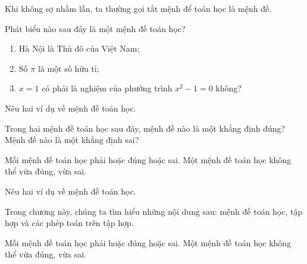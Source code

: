 \documentclass[Main.tex]{subfiles}
\begin{document}
	\begin{note}
		Khi không sợ nhầm lẫn, ta thường gọi tắt mệnh để toán học là mệnh đề.
	\end{note}
	
	\begin{vd}
		Phát biểu nào sau đây là một mệnh đề toán học?
		\begin{enumerate}
			\item Hà Nội là Thủ đô của Việt Nam;
			\item Số $\pi$ là một số hữu tỉ;
			\item $x=1$ có phải là nghiệm của phưởng trình $x^2-1=0$
			không?
		\end{enumerate}
	\end{vd}
	
	\begin{luyentap}
		Nêu hai ví dụ về mệnh đề toán học.
	\end{luyentap}
	
	\begin{hd}
		Trong hai mệnh đề toán học sau đây, mệnh đề nào là một khẳng định đúng? Mệnh đề nào là một khẳng định sai?
	\end{hd}
	
	\begin{kttrongtam}
		Mỗi mệnh đề toán học phải hoặc đúng hoặc sai. Một mệnh đề toán học không thể vừa đúng, vừa sai.
	\end{kttrongtam}
	
	\begin{luyentap}
		Nêu hai ví dụ về mệnh đề toán học.
	\end{luyentap}
	
	\begin{hd}
		Trong chương này, chúng ta tìm hiểu những nội dung sau: mệnh đề toán học, tập hợp và các phép toán trên tập hợp.
	\end{hd}
	
	\begin{kttrongtam}
		Mỗi mệnh đề toán học phải hoặc đúng hoặc sai. Một mệnh đề toán học không thể vừa đúng, vừa sai.
	\end{kttrongtam}
	
\end{document}
